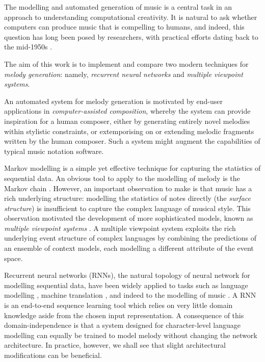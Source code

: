 \documentclass[12pt,a4paper,twoside,openright]{report}
\begin{document}
The modelling and automated generation of music is a central task in an approach
to understanding computational creativity. It is natural to ask whether
computers can produce music that is compelling to humans, and indeed, this
question has long been posed by researchers, with practical efforts dating back
to the mid-1950s \cite{ames1987automated}. 

The aim of this work is to implement and compare two modern techniques for
\emph{melody generation}: namely, \emph{recurrent neural networks} and
\emph{multiple viewpoint systems}.

An automated system for melody generation is motivated by end-user applications
in \emph{computer-assisted composition}, whereby the system can provide
inspiration for a human composer, either by generating entirely novel melodies
within stylistic constraints, or extemporising on or extending melodic
fragments written by the human composer. Such a system might augment the
capabilities of typical music notation software. 

Markov modelling is a simple yet effective technique for capturing the
statistics of sequential data. An obvious tool to apply to the modelling of
melody is the Markov chain \cite{ames1989markov}. However, an important
observation to make is that music has a rich underlying structure: modelling the
statistics of notes directly (the \emph{surface structure}) is insufficient to
capture the complex language of musical style. This observation motivated the
development of more sophisticated models, known as \emph{multiple viewpoint
systems} \cite{conklin1995viewpoints}.  A multiple viewpoint system exploits the
rich underlying event structure of complex languages by combining the
predictions of an ensemble of context models, each modelling a different
attribute of the event space.

Recurrent neural networks (RNNs), the natural topology of neural network for
modelling sequential data, have been widely applied to tasks such as language
modelling \cite{graves2013generating}, machine translation
\cite{sutskever2014sequence}, and indeed to the modelling of music
\cite{boulanger2012modeling}. A RNN is an end-to-end sequence learning tool
which relies on very little domain knowledge aside from the chosen input
representation. A consequence of this domain-independence is that a system
designed for character-level language modelling can equally be trained to model
melody without changing the network architecture. In practice, however, we shall
see that slight architectural modifications can be beneficial.
\end{document}

